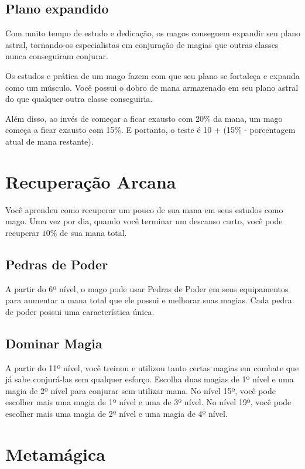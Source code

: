 \documentclass{RPG_Adventure}[2021/10/20]
\begin{document}
\begin{multicols}{2}
\subsection*{Plano expandido}%

Com muito tempo de estudo e dedicação, os magos conseguem expandir seu plano
astral, tornando-os especialistas em conjuração de magias que outras classes
nunca conseguiram conjurar.

Os estudos e prática de um mago fazem com que seu plano se fortaleça e expanda
como um músculo. Você possui o dobro de mana armazenado em seu plano astral do
que qualquer outra classe conseguiria.

Além disso, ao invés de começar a ficar exausto com 20\% da mana, um mago
começa a ficar exausto com 15\%. E portanto, o teste é 10 + (15\% - porcentagem
atual de mana restante).

\section*{Recuperação Arcana}%

Você aprendeu como recuperar um pouco de sua mana em seus estudos como mago. Uma
vez por dia, quando você terminar um descanso curto, você pode recuperar $10\%$
de sua mana total.

\subsection*{Pedras de Poder}%

A partir do 6º nível, o mago pode usar Pedras de Poder em seus equipamentos para
aumentar a mana total que ele possui e melhorar suas magias. Cada pedra de poder
possui uma característica única.

\subsection*{Dominar Magia}%

A partir do 11º nível, você treinou e utilizou tanto certas magias em combate
que já sabe conjurá-las sem qualquer esforço. Escolha duas magias de 1º nível e
uma magia de 2º nível para conjurar sem utilizar mana. No nível 15º, você pode
escolher mais uma magia de 1º nível e uma de 3º nível. No nível 19º, você pode
escolher mais uma magia de 2º nível e uma magia de 4º nível.


\section*{Metamágica}%


\end{multicols}
\end{document}
